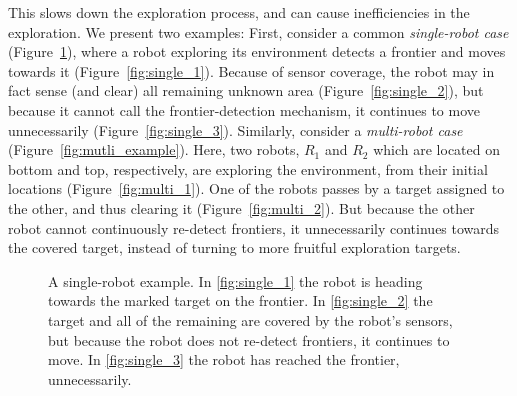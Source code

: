 This slows down the exploration process, and can cause inefficiencies in the
exploration.
We present two examples:
First, consider a common \textit{single-robot case} (Figure~\ref{fig:single_example}),
where a robot exploring its environment detects a frontier and moves towards it (Figure~\ref{fig:single_1}).
Because of sensor coverage, the robot may in fact sense (and clear) all remaining unknown
area (Figure~\ref{fig:single_2}), but because it cannot call the
frontier-detection mechanism, it continues to move unnecessarily
(Figure~\ref{fig:single_3}). Similarly, consider a \textit{multi-robot case}
(Figure~\ref{fig:mutli_example}). Here, two robots,
 $R_1$ and $R_2$ which are located on bottom and top, respectively, 
are exploring the environment, from their initial locations (Figure~\ref{fig:multi_1}). 
One of the robots passes by a target assigned to the other, and thus clearing it
(Figure~\ref{fig:multi_2}).
But because the other robot cannot continuously re-detect frontiers, it unnecessarily continues
towards the covered target, instead of turning to more fruitful exploration targets.

\begin{figure}
 \centering
 \caption{A single-robot example. In 
 \ref{fig:single_1} the robot is heading towards the marked target on the frontier.  In 
 \ref{fig:single_2} the target and all of the remaining are covered by the robot's sensors, but because the robot does
  not re-detect frontiers, it continues to move.  In  \ref{fig:single_3} the robot has reached the frontier, unnecessarily.
 }
 \label{fig:single_example}
\end{figure}


